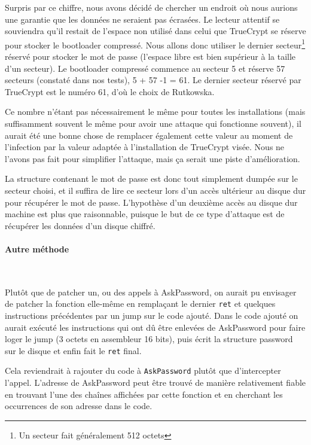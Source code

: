\documentclass[12pt,a4paper]{article}
\begin{document}
Surpris par ce chiffre, nous avons décidé de chercher un endroit où nous aurions
une garantie que les données ne seraient pas écrasées. Le lecteur attentif se
souviendra qu'il restait de l'espace non utilisé dans celui que TrueCrypt se 
réserve pour stocker le bootloader compressé. Nous allons donc utiliser le dernier
secteur\footnote{Un secteur fait généralement 512 octets} réservé pour stocker
le mot de passe (l'espace libre est bien supérieur à la taille d'un secteur).
Le bootloader compressé commence au secteur 5 et réserve 57 secteurs (constaté
dans nos tests), 5 + 57 -1 = 61. Le dernier secteur réservé par TrueCrypt est le
numéro 61, d'où le choix de Rutkowska.

Ce nombre n'étant pas nécessairement le même pour toutes les installations (mais
suffisamment souvent le même pour avoir une attaque qui fonctionne souvent), il
aurait été une bonne chose de remplacer également cette valeur au moment de
l'infection par la valeur adaptée à l'installation de TrueCrypt visée. Nous ne
l'avons pas fait pour simplifier l'attaque, mais ça serait une piste
d'amélioration.

La structure contenant le mot de passe est donc tout simplement dumpée sur le
secteur choisi, et il suffira de lire ce secteur lors d'un accès ultérieur au
disque dur pour récupérer le mot de passe. L'hypothèse d'un deuxième accès au
disque dur machine est plus que raisonnable, puisque le but de ce type d'attaque
est de récupérer les données d'un disque chiffré.


\paragraph{Autre méthode}~

Plutôt que de patcher un, ou des appels à AskPassword, on aurait pu envisager
de patcher la fonction elle-même en remplaçant le dernier \texttt{ret} et 
quelques instructions précédentes par un jump sur le code ajouté. Dans le code
ajouté on aurait exécuté les instructions qui ont dû être enlevées de AskPassword
pour faire loger le jump (3 octets en assembleur 16 bits), puis écrit la structure
password sur le disque et enfin fait le \texttt{ret} final.

Cela reviendrait à rajouter du code à \texttt{AskPassword} plutôt que
d'intercepter l'appel. L'adresse de AskPassword peut être trouvé de manière
relativement fiable en trouvant l'une des chaînes affichées par cette fonction
et en cherchant les occurrences de son adresse dans le code.
\end{document}

